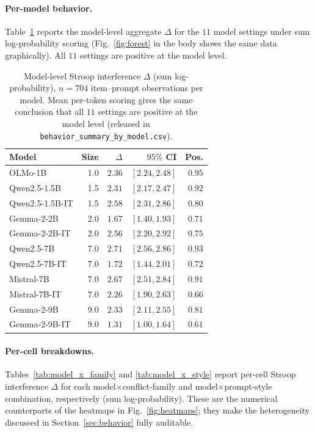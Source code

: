 \documentclass[11pt]{article}
\newcommand{\effect}{\ensuremath{\Delta}\xspace}
\begin{document}
\paragraph{Per-model behavior.}
Table~\ref{tab:per_model} reports the model-level aggregate $\effect$ for the $11$ model
settings under sum log-probability scoring (Fig.~\ref{fig:forest} in the body shows the same
data graphically). All $11$ settings are positive at the model level.

\begin{table}[H]
\centering
\footnotesize
\setlength{\tabcolsep}{3pt}
\begin{tabular*}{\columnwidth}{@{\extracolsep{\fill}}lrrrr@{}}
\toprule
Model & Size & $\effect$ & $95\%$ CI & Pos. \\
\midrule
OLMo-1B           & 1.0  & $2.36$ & $[2.24, 2.48]$ & $0.95$ \\
Qwen2.5-1.5B      & 1.5  & $2.31$ & $[2.17, 2.47]$ & $0.92$ \\
Qwen2.5-1.5B-IT   & 1.5  & $2.58$ & $[2.31, 2.86]$ & $0.80$ \\
Gemma-2-2B        & 2.0  & $1.67$ & $[1.40, 1.93]$ & $0.71$ \\
Gemma-2-2B-IT     & 2.0  & $2.56$ & $[2.20, 2.92]$ & $0.75$ \\
Qwen2.5-7B        & 7.0  & $2.71$ & $[2.56, 2.86]$ & $0.93$ \\
Qwen2.5-7B-IT     & 7.0  & $1.72$ & $[1.44, 2.01]$ & $0.72$ \\
Mistral-7B        & 7.0  & $2.67$ & $[2.51, 2.84]$ & $0.91$ \\
Mistral-7B-IT     & 7.0  & $2.26$ & $[1.90, 2.63]$ & $0.66$ \\
Gemma-2-9B        & 9.0  & $2.33$ & $[2.11, 2.55]$ & $0.81$ \\
Gemma-2-9B-IT     & 9.0  & $1.31$ & $[1.00, 1.64]$ & $0.61$ \\
\bottomrule
\end{tabular*}
\caption{Model-level Stroop interference $\effect$ (sum log-probability), $n{=}704$ item--prompt
observations per model. Mean per-token scoring gives the same conclusion that all $11$ settings
are positive at the model level (released in \texttt{behavior\_summary\_by\_model.csv}).}
\label{tab:per_model}
\end{table}

\paragraph{Per-cell breakdowns.}
Tables~\ref{tab:model_x_family} and \ref{tab:model_x_style} report per-cell Stroop interference
$\effect$ for each model$\times$conflict-family and model$\times$prompt-style combination,
respectively (sum log-probability). These are the numerical counterparts of the heatmaps in
Fig.~\ref{fig:heatmaps}; they make the heterogeneity discussed in
Section~\ref{sec:behavior} fully auditable.
\end{document}
